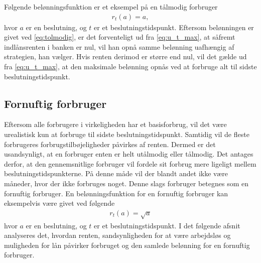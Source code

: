 Følgende belønningsfunktion er et eksempel på en tålmodig forbruger
\begin{align}\label{eq:tolmodig}
    r_t(a) = a,
\end{align}
hvor $a$ er en beslutning, og $t$ er et beslutningstidspunkt. Eftersom belønningen er givet ved \eqref{eq:tolmodig}, er det forventeligt ud fra \eqref{eq:u_t_max}, at såfremt indlånsrenten i banken er nul, vil han opnå samme belønning uafhængig af strategien, han vælger.
Hvis renten derimod er større end nul, vil det gælde ud fra \eqref{eq:u_t_max}, at den maksimale belønning opnås ved at forbruge alt til sidste beslutningstidspunkt. 

\subsection{Fornuftig forbruger}
Eftersom alle forbrugere i virkeligheden har et basisforbrug, vil det være urealistisk kun at forbruge til sidste beslutningstidspunkt. Samtidig vil de fleste forbrugeres forbrugstilbøjeligheder påvirkes af renten. Dermed er det usandsynligt, at en forbruger enten er helt utålmodig eller tålmodig. Det antages derfor, at den gennemsnitlige forbruger vil fordele sit forbrug mere ligeligt mellem beslutningstidspunkterne. På denne måde vil der blandt andet ikke være måneder, hvor der ikke forbruges noget. Denne slags forbruger betegnes som en fornuftig forbruger. En belønningsfunktion for en fornuftig forbruger kan eksempelvis være givet ved følgende
\begin{align}\label{eq:belønning_fornuftig_forbruger}
    r_t(a) = \sqrt{a}
\end{align}
hvor $a$ er en beslutning, og $t$ er et beslutningstidspunkt. I det følgende afsnit analyseres det, hvordan renten, sandsynligheden for at være arbejdsløs og muligheden for lån påvirker forbruget og den samlede belønning for en fornuftig forbruger.






